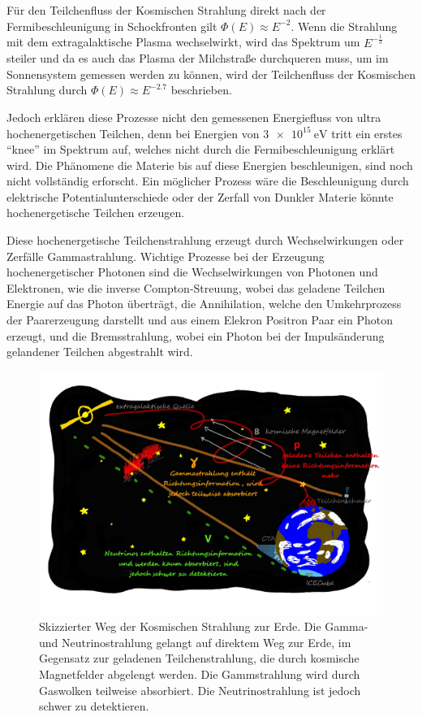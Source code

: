 Für den Teilchenfluss der Kosmischen Strahlung direkt nach der Fermibeschleunigung in Schockfronten gilt
$\Phi(E)\approx E^{-2}$.
Wenn die Strahlung mit dem extragalaktische Plasma wechselwirkt, wird das Spektrum um $E^{-\frac{1}{3}}$ steiler und
da es auch das Plasma der Milchstraße durchqueren muss, um im Sonnensystem gemessen werden zu können, wird
der Teilchenfluss der Kosmischen Strahlung durch $\Phi(E) \approx E^{-2.7}$\cite[5]{Cosmic_rays} beschrieben.

Jedoch erklären diese Prozesse nicht den gemessenen Energiefluss von ultra hochenergetischen Teilchen, denn bei Energien von $\SI{3e15}{\eV}$ tritt ein erstes
\enquote{knee} im Spektrum auf, welches nicht durch die Fermibeschleunigung erklärt wird.
Die Phänomene die Materie bis auf diese Energien beschleunigen, sind noch nicht vollständig erforscht.
Ein möglicher Prozess wäre die Beschleunigung durch elektrische Potentialunterschiede oder der Zerfall von Dunkler Materie könnte
hochenergetische Teilchen erzeugen.

Diese hochenergetische Teilchenstrahlung erzeugt durch Wechselwirkungen oder Zerfälle Gammastrahlung.
Wichtige Prozesse bei der Erzeugung hochenergetischer Photonen sind die Wechselwirkungen von Photonen und Elektronen, wie
die inverse Compton-Streuung, wobei das geladene Teilchen Energie auf das Photon
überträgt, die Annihilation, welche den Umkehrprozess der Paarerzeugung darstellt und aus einem Elekron Positron Paar
ein Photon erzeugt, und die Bremsstrahlung, wobei ein Photon bei der Impulsänderung gelandener Teilchen abgestrahlt wird.

\begin{figure}
  \includegraphics[width=\textwidth]{Plots/Folie5.pdf}
  \centering
  \caption{Skizzierter Weg der Kosmischen Strahlung zur Erde. Die Gamma- und Neutrinostrahlung gelangt auf direktem Weg zur Erde, im Gegensatz
            zur geladenen Teilchenstrahlung, die durch kosmische Magnetfelder abgelengt werden. Die Gammstrahlung wird durch Gaswolken teilweise
            absorbiert. Die Neutrinostrahlung ist jedoch schwer zu detektieren.}
  \label{abb:Folie5}
\end{figure}

